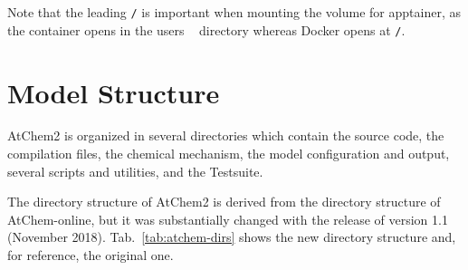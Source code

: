 Note that the leading \texttt{/} is important when mounting the volume
for apptainer, as the container opens in the users \texttt{~}
directory whereas Docker opens at \texttt{/}.

\section{Model Structure} \label{sec:model-structure}

AtChem2 is organized in several directories which contain the source
code, the compilation files, the chemical mechanism, the model
configuration and output, several scripts and utilities, and the Testsuite.

The directory structure of AtChem2 is derived from the directory
structure of AtChem-online, but it was substantially changed with the
release of version 1.1 (November 2018). Tab.~\ref{tab:atchem-dirs}
shows the new directory structure and, for reference, the original
one.

